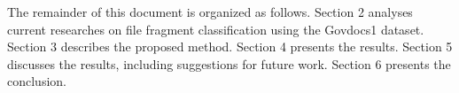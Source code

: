 
The remainder of this document is organized as follows.
    Section 2 analyses current researches on file fragment classification using the Govdocs1 dataset. 
    Section 3 describes the proposed method.
    Section 4 presents the results.
    Section 5 discusses the results, including suggestions for future work.
    Section 6 presents the conclusion.
